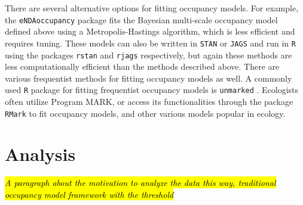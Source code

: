\documentclass[12pt]{article}\usepackage[]{graphicx}\usepackage[]{color}
\begin{document}
There are several alternative options for fitting occupancy models. For example, the \texttt{eNDAoccupancy} \cite{Dorazio_Erickson} package fits the Bayesian multi-scale occupancy model defined above using a Metropolis-Hastings algorithm, which is less efficient and requires tuning. These models can also be written in \texttt{STAN} or \texttt{JAGS} and run in \texttt{R} using the packages \texttt{rstan} \cite{rstan} and \texttt{rjags} \cite{rjags} respectively, but again these methods are less computationally efficient than the methods described above. There are various frequentist methods for fitting occupancy models as well.  A commonly used \texttt{R} package for fitting frequentist occupancy models is \texttt{unmarked} \cite{unmarked}. Ecologists often utilize Program MARK, or access its functionalities through the  package \texttt{RMark} \cite{RMark} to fit occupancy models, and other various models popular in ecology.

\section{Analysis}

\hl{\textit{A paragraph about the motivation to analyze the data this way, traditional occupancy model framework with the threshold }}
\end{document}
